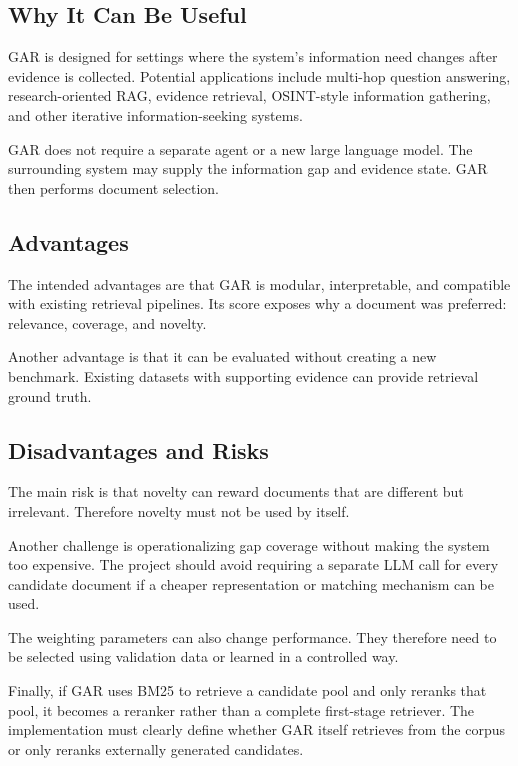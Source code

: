 \documentclass[11pt,a4paper]{article}
\begin{document}
\subsection{Why It Can Be Useful}

GAR is designed for settings where the system's information need changes after evidence is collected. Potential applications include multi-hop question answering, research-oriented RAG, evidence retrieval, OSINT-style information gathering, and other iterative information-seeking systems.

GAR does not require a separate agent or a new large language model. The surrounding system may supply the information gap and evidence state. GAR then performs document selection.

\subsection{Advantages}

The intended advantages are that GAR is modular, interpretable, and compatible with existing retrieval pipelines. Its score exposes why a document was preferred: relevance, coverage, and novelty.

Another advantage is that it can be evaluated without creating a new benchmark. Existing datasets with supporting evidence can provide retrieval ground truth.

\subsection{Disadvantages and Risks}

The main risk is that novelty can reward documents that are different but irrelevant. Therefore novelty must not be used by itself.

Another challenge is operationalizing gap coverage without making the system too expensive. The project should avoid requiring a separate LLM call for every candidate document if a cheaper representation or matching mechanism can be used.

The weighting parameters can also change performance. They therefore need to be selected using validation data or learned in a controlled way.

Finally, if GAR uses BM25 to retrieve a candidate pool and only reranks that pool, it becomes a reranker rather than a complete first-stage retriever. The implementation must clearly define whether GAR itself retrieves from the corpus or only reranks externally generated candidates.
\end{document}
